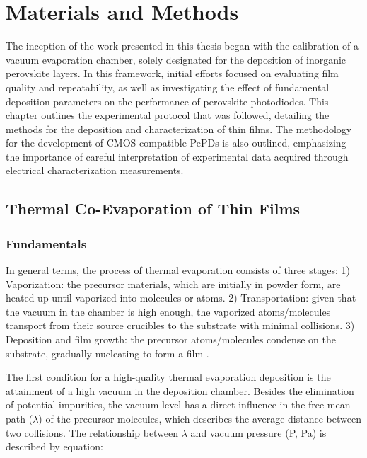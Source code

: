 \chapter{Materials and Methods}\label{ch:material_properties}

The inception of the work presented in this thesis began with the calibration of a vacuum evaporation chamber, solely designated for the deposition of inorganic perovskite layers. In this framework, initial efforts focused on evaluating film quality and repeatability, as well as investigating the effect of fundamental deposition parameters on the performance of perovskite photodiodes. This chapter outlines the experimental protocol that was followed, detailing the methods for the deposition and characterization of  thin films. The methodology for the development of CMOS-compatible PePDs is also outlined, emphasizing the importance of careful interpretation of experimental data acquired through electrical characterization measurements.  


\section{Thermal Co-Evaporation of  Thin Films}

\subsection{Fundamentals} \label{sec:materials_methods:fundamentals}

In general terms, the process of thermal evaporation consists of three stages: 1) Vaporization: the precursor materials, which are initially in powder form, are heated up until vaporized into molecules or atoms. 2) Transportation: given that the vacuum in the chamber is high enough, the vaporized atoms/molecules transport from their source crucibles to the substrate with minimal collisions. 3) Deposition and film growth: the precursor atoms/molecules condense on the substrate, gradually nucleating to form a film \cite{Du2022ThermalOutlook}. 

The first condition for a high-quality thermal evaporation deposition is the attainment of a high vacuum in the deposition chamber. Besides the elimination of potential impurities, the vacuum level has a direct influence in the free mean path ($\lambda$) of the precursor molecules, which describes the average distance between two collisions. The relationship between $\lambda$ and vacuum pressure (P, Pa) is described by equation:

